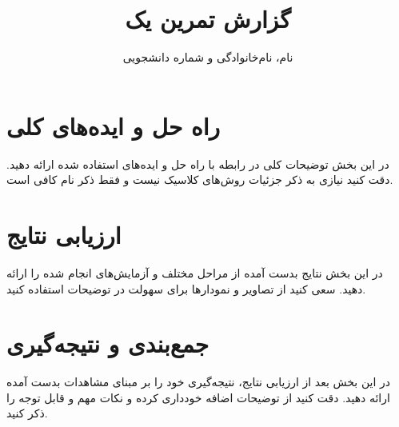 \documentclass{article}
\title{گزارش تمرین یک}
\author{نام، نام‌خانوادگی و شماره دانشجویی}
\date{}
\begin{document}
\maketitle
\section{راه حل و ایده‌های کلی}
در این بخش توضیحات کلی در رابطه با راه حل و ایده‌های استفاده شده ارائه دهید. دقت کنید نیازی به ذکر جزئیات روش‌های کلاسیک نیست و فقط ذکر نام کافی است.
\section{ارزیابی نتایج}
در این بخش نتایج بدست آمده از مراحل مختلف و آزمایش‌های انجام شده را ارائه دهید. سعی کنید از تصاویر و نمودارها برای سهولت در توضیحات استفاده کنید.
\section{جمع‌بندی و نتیجه‌گیری}
در این بخش بعد از ارزیابی نتایج، نتیجه‌گیری خود را بر مبنای مشاهدات بدست آمده ارائه دهید. دقت کنید از توضیحات اضافه خودداری کرده و نکات مهم و قابل توجه را ذکر کنید.
\end{document}
